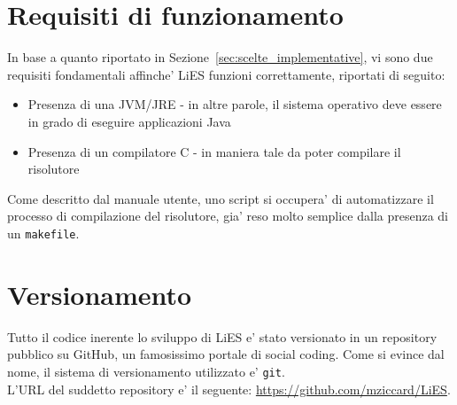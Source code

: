 \documentclass{article}
\begin{document}

\section{Requisiti di funzionamento}
\label{sec:requisiti_funzionamento}

In base a quanto riportato in Sezione~\ref{sec:scelte_implementative}, vi sono due requisiti fondamentali affinche' LiES funzioni correttamente, riportati di seguito:
\begin{itemize}
	\item Presenza di una JVM/JRE - in altre parole, il sistema operativo deve essere in grado di eseguire applicazioni Java
	\item Presenza di un compilatore C - in maniera tale da poter compilare il risolutore
\end{itemize}

Come descritto dal manuale utente, uno script si occupera' di automatizzare il processo di compilazione del risolutore, gia' reso molto semplice dalla presenza di un \verb+makefile+.


\section{Versionamento}
\label{sec:versionamento}

Tutto il codice inerente lo sviluppo di LiES e' stato versionato in un repository pubblico su GitHub, un famosissimo portale di social coding. Come si evince dal nome, il sistema di versionamento utilizzato e' \verb+git+.\\

L'URL del suddetto repository e' il seguente: \url{https://github.com/mziccard/LiES}.

\end{document}
